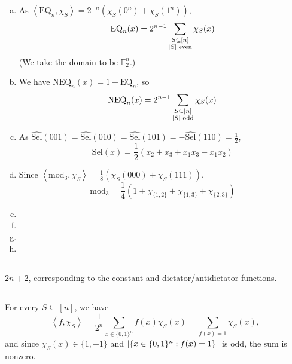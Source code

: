 \documentclass[12pt]{article}
\newcommand{\bitset}{\{0,1\}}
\newcommand{\fbitset}{\{1,-1\}}
\newcommand{\F}{\mathbb F}
\newcommand{\set}[1]{\{#1\}}
\newcommand{\eqn}[1]{\begin{equation*}#1\end{equation*}}
\newcommand{\sumx}{\sum_{x \in \bitset^n}}
\renewcommand{\ip}[1]{\left\langle#1\right\rangle}
\begin{document}
\begin{enumerate}[(a)]
    \item As $\ip{\text{EQ}_n,\chi_S} = 2^{-n}(\chi_S(0^n) + \chi_S(1^n))$,
	      \eqn{\text{EQ}_n(x) = 2^{n-1}\sum_{\substack{S \subseteq [n]\\\abs{S} \text{ even}}} \chi_S(x)}
	      (We take the domain to be $\F_2^n$.)

    \item We have $\text{NEQ}_n(x) = 1 + \text{EQ}_n$, so
	      \eqn{\text{NEQ}_n(x) = 2^{n-1}\sum_{\substack{S \subseteq [n]\\\abs{S} \text{ odd}}} \chi_S(x)}

    \item As $\widehat{\text{Sel}}(001) = \widehat{\text{Sel}}(010) = \widehat{\text{Sel}}(101) = - \widehat{\text{Sel}}(110) = \frac{1}{2}$,
		    \eqn{\text{Sel}(x) = \frac{1}{2}(x_2 + x_3 + x_1 x_3 - x_1 x_2)}

    \item Since $\ip{\text{mod}_3, \chi_{S}} = \frac1{8}(\chi_{S}(000) + \chi_{S}(111))$,
	      \eqn{\text{mod}_3 = \frac1{4} \left(1 + \chi_{\set{1,2}} + \chi_{\set{1,3}} + \chi_{\set{2,3}}\right)}

    \item

    \item

    \item

    \item
\end{enumerate}
	
\subsection{}
 $2n+2$, corresponding to the constant and dictator/antidictator functions.
	
\subsection{}
For every $S \subseteq [n]$, we have
\eqn{\ip{f, \chi_S} = \frac1{2^n} \sumx f(x) \chi_S(x) = \sum_{f(x) = 1} \chi_S(x),}
and since $\chi_S(x) \in \fbitset$ and $\abs{\set{x \in \bitset^n : f(x) = 1}}$ is odd, the sum is nonzero.

\subsection{}

\subsection{}
\end{document}
